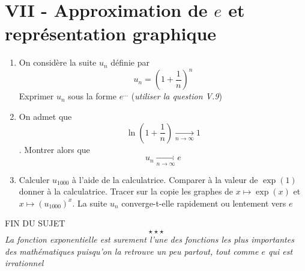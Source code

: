 \section*{VII - Approximation de $e$ et représentation graphique}
\begin{enumerate}
\item On considère la suite $u_n$ définie par $$u_n = \left(1+ \frac{1}{n}\right)^n$$
Exprimer $u_n$ sous la forme $e^{\ldots}$ (\emph{utiliser la question V.9})
\item On admet que $$\ln\left(1+\frac{1}{n}\right) \underset{n \rightarrow \infty}{\longrightarrow} 1$$. Montrer alors que $$u_n\underset{n \rightarrow \infty}{\longrightarrow} e$$
\item Calculer $u_{1000}$ à l'aide de la calculatrice. Comparer à la valeur de $\exp(1)$ donner à la calculatrice. Tracer sur la copie les graphes de $x\mapsto\exp(x)$ et $x\mapsto (u_{1000})^x$. La suite $u_n$ converge-t-elle rapidement ou lentement vers $e$
\end{enumerate}
\center
FIN DU SUJET
\flushleft
$$\star \star \star$$
\emph{La fonction exponentielle est surement l'une des fonctions les plus importantes des mathématiques puisqu'on la retrouve un peu partout, tout comme $e$ qui est irrationnel}
